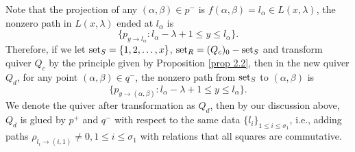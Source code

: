 \documentclass[a4paper, reqno]{amsart}
\theoremstyle{definition}
\theoremstyle{remark}
\numberwithin{equation}{section}
\begin{document}
Note that the projection of any $(\alpha,\beta)\in p^{-}$ is $f(\alpha,\beta) = l_\alpha \in L(x,\lambda)$, the nonzero path in $L(x,\lambda)$ ended at $ l_\alpha$ is
$$
\{ p_{y\to l_{\alpha}}: l_{\alpha} - \lambda+1 \leq y \leq l_{\alpha} \}.
$$
Therefore, if we let ${\rm{set}}_S = \{1,2,\dots,x\}$, ${\rm{set}}_R = (Q_c)_0 - {\rm{set}}_S$ and transform quiver $Q_c$ by the principle given by Proposition \ref{prop 2.2}, then in the new quiver $Q_d$, for any point $(\alpha,\beta) \in q^{-}$, the nonzero path from ${\rm{set}}_S$ to  $(\alpha,\beta)$ is 
$$
\{ p_{y\to (\alpha,\beta)}: l_{\alpha} - \lambda+1 \leq y \leq l_{\alpha} \}.
$$
We denote the quiver after transformation as $Q_d$, then by our discussion above, $Q_d$ is glued by $p^{+}$ and $q^{-}$ with respect to the same data $\{l_i \}_{1\leq i \leq \sigma_1}$, i.e.,
adding paths $ \rho_{l_i \to (i,1)} \neq 0, 1\leq i\leq \sigma_1 $ with relations that all squares are commutative. 
\end{document}
